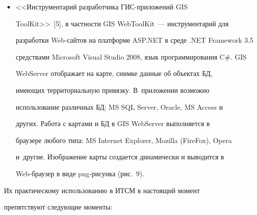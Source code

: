 \begin{enumerate}[1.]
\begin{itemize}
приложениях~[4]. Он использует идеологию ГИС <<MapInfo>>, 


использованную и в ГИС MS MapPoint;


     \item <<Инструментарий разработчика ГИС-приложений GIS 


ToolKit>>~[5], в частности GIS WebToolKit~--- инструментарий  для 


разработки Web-сай\-тов на платформе ASP.NET в среде .NET Framework 3.5  


средствами Microsoft Visual Studio 2008, язык программирования  C\#. GIS 


WebServer отображает на карте, снимке данные об объектах БД, 


имеющих территориальную привязку. В~приложении возможно 


использование различных БД: MS SQL Server, Oracle, MS Access и 


других. Работа с картами и БД в GIS WebServer выполняется в 


браузере любого типа: MS Internet Explorer, Mozilla (FireFox), Opera 


и~другие. Изображение карты создается динамически и выводится в 


     Web-браузер в виде png-рисунка (рис.~9).


     \end{itemize}


     \end{enumerate}


          Их практическому использованию в ИТСМ в настоящий момент 


препятствуют следующие моменты:


